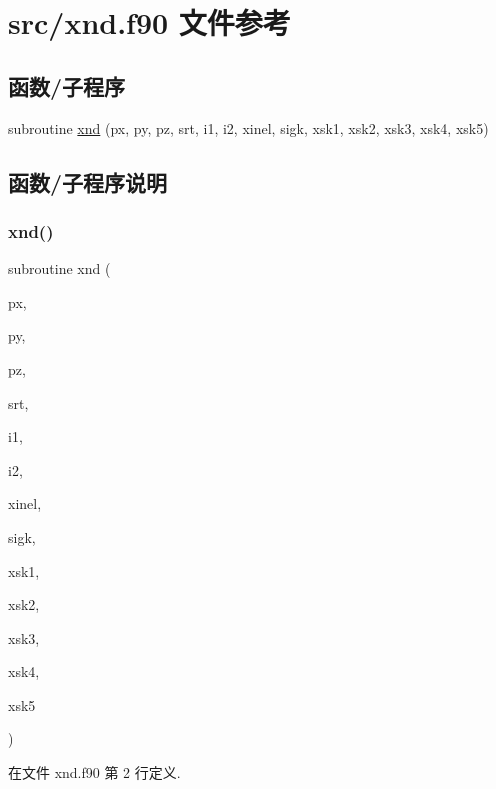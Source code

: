 \hypertarget{xnd_8f90}{}\section{src/xnd.f90 文件参考}
\label{xnd_8f90}
\subsection*{函数/子程序}
\begin{DoxyCompactItemize}
\item 
subroutine \mbox{\hyperlink{xnd_8f90_a5c2e7f2d4a97300946911f9008c772ee}{xnd}} (px, py, pz, srt, i1, i2, xinel, sigk, xsk1, xsk2, xsk3, xsk4, xsk5)
\end{DoxyCompactItemize}


\subsection{函数/子程序说明}
\mbox{\label{xnd_8f90_a5c2e7f2d4a97300946911f9008c772ee}} 
\subsubsection{\texorpdfstring{xnd()}{xnd()}}
{\footnotesize\ttfamily subroutine xnd (\begin{DoxyParamCaption}\item[{}]{px,  }\item[{}]{py,  }\item[{}]{pz,  }\item[{}]{srt,  }\item[{}]{i1,  }\item[{}]{i2,  }\item[{}]{xinel,  }\item[{}]{sigk,  }\item[{}]{xsk1,  }\item[{}]{xsk2,  }\item[{}]{xsk3,  }\item[{}]{xsk4,  }\item[{}]{xsk5 }\end{DoxyParamCaption})}



在文件 xnd.\+f90 第 2 行定义.

